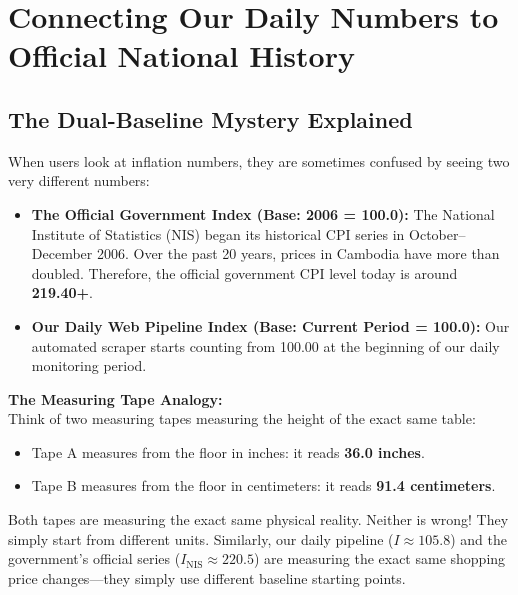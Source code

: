 \documentclass[11pt,a4paper,oneside]{article}
\begin{document}
\newpage

\section{Connecting Our Daily Numbers to Official National History}

\subsection{The Dual-Baseline Mystery Explained}
When users look at inflation numbers, they are sometimes confused by seeing two very different numbers:
\begin{itemize}
    \item \textbf{The Official Government Index (Base: 2006 = 100.0):} The National Institute of Statistics (NIS) began its historical CPI series in October--December 2006. Over the past 20 years, prices in Cambodia have more than doubled. Therefore, the official government CPI level today is around \textbf{219.40+}.
    \item \textbf{Our Daily Web Pipeline Index (Base: Current Period = 100.0):} Our automated scraper starts counting from 100.00 at the beginning of our daily monitoring period.
\end{itemize}

\textbf{The Measuring Tape Analogy:}\\
Think of two measuring tapes measuring the height of the exact same table:
\begin{itemize}[noitemsep]
    \item Tape A measures from the floor in inches: it reads \textbf{36.0 inches}.
    \item Tape B measures from the floor in centimeters: it reads \textbf{91.4 centimeters}.
\end{itemize}
Both tapes are measuring the exact same physical reality. Neither is wrong! They simply start from different units. Similarly, our daily pipeline ($I \approx 105.8$) and the government's official series ($I_{\text{NIS}} \approx 220.5$) are measuring the exact same shopping price changes---they simply use different baseline starting points.
\end{document}
